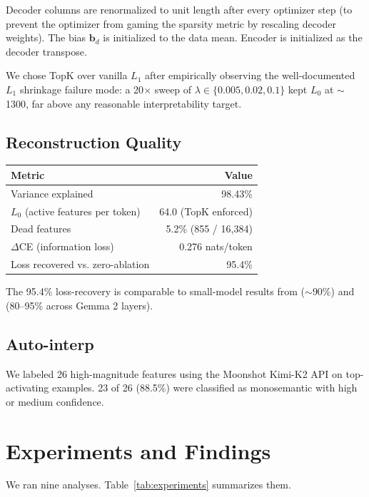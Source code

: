 \documentclass[11pt]{article}
\begin{document}
Decoder columns are renormalized to unit length after every optimizer step (to
prevent the optimizer from gaming the sparsity metric by rescaling decoder
weights). The bias $\mathbf{b}_d$ is initialized to the data mean. Encoder is
initialized as the decoder transpose.

We chose TopK over vanilla $L_1$ after empirically observing the well-documented
$L_1$ shrinkage failure mode: a 20$\times$ sweep of $\lambda \in \{0.005, 0.02, 0.1\}$
kept $L_0$ at $\sim$1300, far above any reasonable interpretability target.

\subsection{Reconstruction Quality}

\begin{tabular}{lr}
\toprule
Metric & Value \\
\midrule
Variance explained & 98.43\% \\
$L_0$ (active features per token) & 64.0 (TopK enforced) \\
Dead features & 5.2\% (855 / 16{,}384) \\
$\Delta$CE (information loss) & 0.276 nats/token \\
Loss recovered vs. zero-ablation & 95.4\% \\
\bottomrule
\end{tabular}

The 95.4\% loss-recovery is comparable to small-model results from
\citep{bricken2023monosemanticity} ($\sim$90\%) and \citep{lieberum2024gemma}
(80--95\% across Gemma 2 layers).

\subsection{Auto-interp}

We labeled 26 high-magnitude features using the Moonshot Kimi-K2 API on
top-activating examples. 23 of 26 (88.5\%) were classified as monosemantic with
high or medium confidence.

\section{Experiments and Findings}

We ran nine analyses. Table~\ref{tab:experiments} summarizes them.
\end{document}
